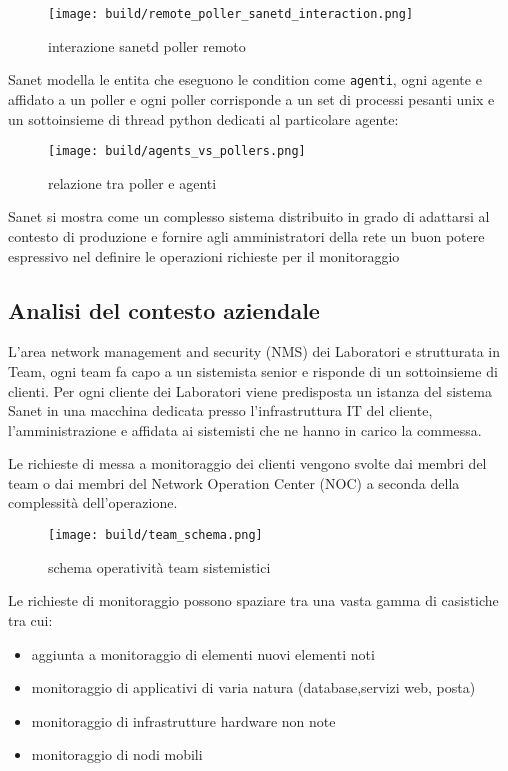 \documentclass[12pt,a4paper,twoside,openright]{book}
\begin{document}
\begin{figure}[H]
    \centering
    \texttt{[image: build/remote\_poller\_sanetd\_interaction.png]}
    \caption{interazione sanetd poller remoto}
    \label{fig:enter-label}
\end{figure}

Sanet modella le entita che eseguono le condition come \verb|agenti|, ogni agente e affidato a un poller e ogni poller corrisponde a un set di processi pesanti unix e un sottoinsieme di thread python dedicati al particolare agente:


\begin{figure}[H]
    \centering
    \texttt{[image: build/agents\_vs\_pollers.png]}
    \caption{relazione tra poller e agenti}
    \label{fig:enter-label}
\end{figure}

Sanet si mostra come un complesso sistema distribuito in grado di adattarsi al contesto di produzione e fornire agli amministratori della rete un buon potere espressivo nel definire le operazioni richieste per il monitoraggio

\subsection{Analisi del contesto aziendale}

L'area network management and security (NMS) dei Laboratori e strutturata in Team, ogni team fa capo a un sistemista senior e risponde di un sottoinsieme di clienti. Per ogni cliente dei Laboratori viene predisposta un istanza del sistema Sanet in una macchina dedicata presso l'infrastruttura IT del cliente, l'amministrazione e affidata ai sistemisti che ne hanno in carico la commessa.

Le richieste di messa a monitoraggio dei clienti vengono svolte dai membri del team o dai membri del Network Operation Center (NOC) a seconda della complessità dell'operazione.

\begin{figure}[H]
    \centering
    \texttt{[image: build/team\_schema.png]}
    \caption{schema operatività team sistemistici}
    \label{fig:enter-label}
\end{figure}

Le richieste di monitoraggio possono spaziare tra una vasta gamma di casistiche tra cui:

\begin{itemize}
  \item{aggiunta a monitoraggio di elementi nuovi elementi noti}
  \item{monitoraggio di applicativi di varia natura (database,servizi web, posta)}
  \item{monitoraggio di infrastrutture hardware non note}
  \item{monitoraggio di nodi mobili}
\end{itemize}
\end{document}
